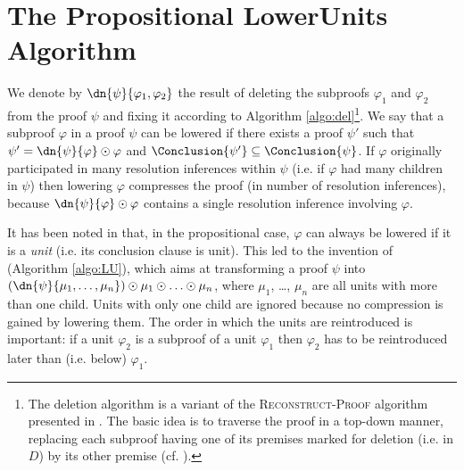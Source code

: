 
\section{The Propositional LowerUnits Algorithm}
\label{sec:PropositionalLU}

We denote by $\dn{\psi}{\varphi_1, \varphi_2}$ the result of deleting the subproofs $\varphi_1$ and $\varphi_2$ from the proof $\psi$ and fixing it according to Algorithm \ref{algo:del}\footnote{
  The deletion algorithm is a variant of the \textsc{Reconstruct-Proof} algorithm presented in \cite{RP11}.
  The basic idea is to traverse the proof in a top-down manner, replacing
  each subproof having one of its premises marked for deletion (i.e. in $D$) by its other premise (cf. \cite{Boudou}).
}. 
We say that a subproof $\varphi$ in a proof $\psi$ can be lowered 
if there exists a proof
$\psi'$ such that $\psi' = \dn{\psi}{\varphi} \odot \varphi$ and
$\Conclusion{\psi'} \subseteq \Conclusion{\psi}$. If $\varphi$ originally participated in many resolution inferences within $\psi$ (i.e. if $\varphi$ had many children in $\psi$) then lowering $\varphi$ compresses the proof (in number of resolution inferences), because $\dn{\psi}{\varphi} \odot \varphi$ contains a single resolution inference involving $\varphi$.

%
It has been noted in \cite{LURPI} that, in the propositional case, $\varphi$ can always be lowered if it is a \emph{unit} (i.e. its conclusion clause is unit). This led to the invention of {\LowerUnits} (Algorithm \ref{algo:LU}), which aims at transforming a proof $\psi$ into $(\dn{\psi}{\mu_1,\ldots,\mu_n}) \odot \mu_1 \odot \ldots \odot \mu_n$, where $\mu_1$, \ldots, $\mu_n$ are all units with more than one child. Units with only one child are ignored because no compression is gained by lowering them. The order in which the units are reintroduced is important:
if a unit $\varphi_2$ is a subproof of a unit
$\varphi_1$ then $\varphi_2$ has to be reintroduced later than (i.e. below) $\varphi_1$.


\newlength\algowd
\def\savewd#1{\setbox0=\hbox{#1\hspace{.7in}}\algowd=\wd0\relax#1}
\newcommand\algolines[2]{\savewd{#1}%
  \tcp*{\parbox[t]{\dimexpr\algowidth-\algowd}{#2}}}



